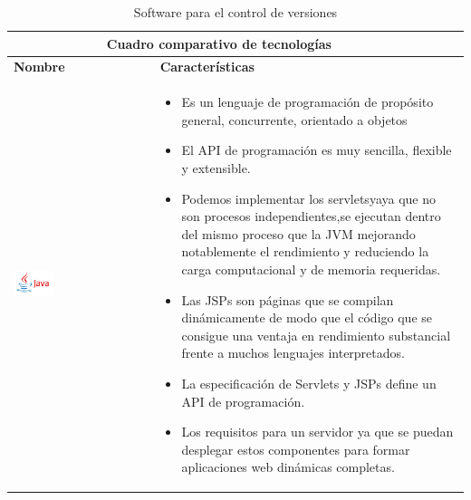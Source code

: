\begin{table}[b!]
    \centering
    \vspace{-30mm}
      \begin{tabular}{|p{2cm}|ll}
        \hline
        
        \multicolumn{2}{|c|}{{\bf Cuadro comparativo de tecnologías}} \\ 
        \hline
          \multicolumn{1}{|p{4cm}|}{{\bf Nombre}} & 
		  \multicolumn{1}{p{10cm}|}{{\bf Características}}\\

        \hline
          \multicolumn{1}{|p{5cm}|}{\includegraphics[width=0.3\textwidth]{images/java}} & 
          \multicolumn{2}{p{10cm}|}{\begin{itemize}
          \vspace{-17mm}
        \item Es un lenguaje de programación de propósito general, concurrente, orientado a objetos 
        \item El API de programación es muy sencilla, flexible y extensible.
        \item Podemos implementar los servletsyaya que no son procesos independientes,se ejecutan dentro del mismo proceso que la JVM mejorando notablemente el rendimiento y reduciendo la carga computacional y de memoria requeridas.
		\item Las JSPs son páginas que se compilan dinámicamente de modo que el código que se consigue una ventaja en rendimiento substancial frente a muchos lenguajes interpretados.
         \item La especificación de Servlets y JSPs define un API de programación.
         \item Los requisitos para un servidor ya que se puedan desplegar estos componentes para formar aplicaciones web dinámicas completas. 
       
      \end{itemize}} \\
        \hline
        
      \end{tabular}
      \caption{Software para el control de versiones}
      \label{Cuadro Comparativo de software para la gestión y construcción de proyectos}
    \end{table}
